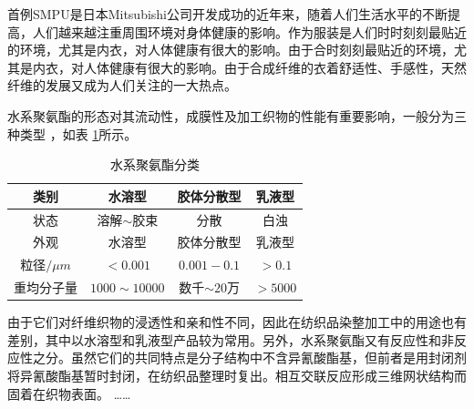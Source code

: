 首例SMPU是日本Mitsubishi公司开发成功的近年来，随着人们生活水平的不断提高，人们越来越注重周围环境对身体健康的影响。作为服装是人们时时刻刻最贴近的环境，尤其是内衣，对人体健康有很大的影响。由于合时刻刻最贴近的环境，尤其是内衣，对人体健康有很大的影响。由于合成纤维的衣着舒适性、手感性，天然纤维的发展又成为人们关注的一大热点。



水系聚氨酯的形态对其流动性，成膜性及加工织物的性能有重要影响，一般分为三种类型 ，如表 \ref{tab:category}所示。

\begin{table}[!hbt]
  \centering
  \caption{水系聚氨酯分类} \label{tab:category}
  
  \begin{tabular*}{0.9\textwidth}{@{\extracolsep{\fill}}cccc}
  \toprule
    类别			&水溶型		&胶体分散型		&乳液型 \\
  \midrule
    状态			&溶解$\sim$胶束	&分散		&白浊 \\
    外观			&水溶型		&胶体分散型		&乳液型 \\
    粒径$/\mu m$	&$<0.001$		&$0.001-0.1$		&$>0.1$ \\
    重均分子量	&$1000\sim 10000$	&数千$\sim 20万$ &$>5000$ \\
  \bottomrule
  \end{tabular*}
\end{table}

由于它们对纤维织物的浸透性和亲和性不同，因此在纺织品染整加工中的用途也有差别，其中以水溶型和乳液型产品较为常用。另外，水系聚氨酯又有反应性和非反应性之分。虽然它们的共同特点是分子结构中不含异氰酸酯基，但前者是用封闭剂将异氰酸酯基暂时封闭，在纺织品整理时复出。相互交联反应形成三维网状结构而固着在织物表面。
……
\fi
